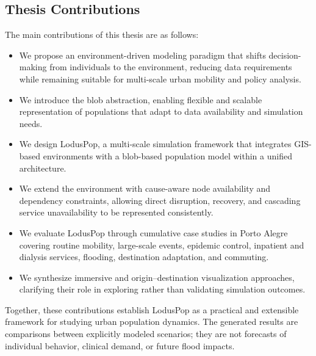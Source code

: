 \documentclass[pdflatex,sn-mathphys-num]{sn-jnl}%
\newcommand\redb[1]{#1}
\newcommand\blue[1]{#1}
\theoremstyle{thmstyleone}%
\theoremstyle{thmstyletwo}%
\theoremstyle{thmstylethree}%
\begin{document}
\subsection{Thesis Contributions}

\blue{
The main contributions of this thesis are as follows:
\begin{itemize}
    \item We propose an environment-driven modeling paradigm that shifts decision-making from individuals to the environment, \redb{reducing data requirements while remaining suitable for multi-scale urban mobility and policy analysis.}
    \item We introduce the blob abstraction, enabling flexible and scalable representation of populations that adapt to data availability and simulation needs.
    \item \redb{We design LodusPop, a multi-scale simulation framework that integrates GIS-based environments with a blob-based population model within a unified architecture.}%
    \item We extend the environment with cause-aware node availability and dependency constraints, allowing direct disruption, recovery, and cascading service unavailability to be represented consistently.
    \item We evaluate LodusPop through cumulative case studies in Porto Alegre covering routine mobility, large-scale events, epidemic control, inpatient and dialysis services, flooding, destination adaptation, and commuting.
    \item We synthesize immersive and origin--destination visualization approaches, clarifying their role in exploring rather than validating simulation outcomes.
\end{itemize}

Together, these contributions establish LodusPop as a practical and extensible framework for studying urban population dynamics. The generated results are comparisons between explicitly modeled scenarios; they are not forecasts of individual behavior, clinical demand, or future flood impacts.}
\end{document}
